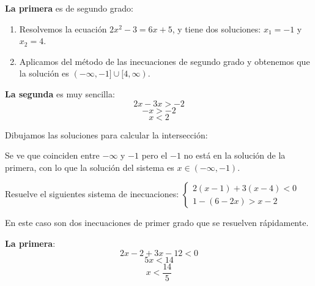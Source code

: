 \documentclass[a4paper,11pt,answers]{exam}
\begin{document}
\begin{questions}
\begin{solution}
    \textbf{La primera} es de segundo grado:
    \begin{enumerate}
    \item Resolvemos la ecuación $2x^2 - 3 = 6x+5$, y tiene dos soluciones: $x_1 = -1$ y $x_2= 4$.
    \item Aplicamos del método de las inecuaciones de segundo grado y obtenemos que la solución es
      $(-\infty, -1] \cup [4, \infty)$.
    \end{enumerate}

    \textbf{La segunda} es muy sencilla:
    \[2x - 3x > -2\]
    \[-x > -2\]
    \[x < 2\]

    Dibujamos las soluciones para calcular la intersección:
    \begin{center}
    \end{center}
    Se ve que coinciden entre $-\infty$ y $-1$ pero el $-1$ no está en la solución de la primera,
    con lo que la solución del sistema es $x \in (-\infty, -1)$.
  \end{solution}
\question Resuelve el siguientes sistema de inecuaciones:
  $
  \begin{cases}
    2(x-1) + 3(x-4)< 0\\
    1-(6-2x) > x-2
  \end{cases}
  $
  \begin{solution}
    En este caso son dos inecuaciones de primer grado que se resuelven rápidamente.

    \textbf{La primera}:
    \[2x - 2+3x-12 < 0\]
    \[5x < 14\]
    \[x < \frac{14}{5}\]


\end{solution}
\end{questions}
\end{document}
